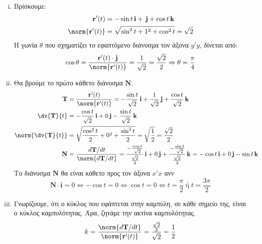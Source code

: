 \documentclass[a4paper,table]{report}
\begin{document}
\begin{solution}
  \begin{enumerate}[i)]
    \item 
      Βρίσκουμε:
      \begin{align*}
        \mathbf{r'}(t)&=- \sin{t}\, \mathbf{i} +\, \mathbf{j} + \cos{t} \, \mathbf{k} \\
        \norm{\mathbf{r'}(t)} &= \sqrt{\sin^{2}{t} + 1^{2} + \cos^{2}{t}} = \sqrt{2}
      \end{align*} 
      Η γωνία $\theta$ που σχηματίζει το εφαπτόμενο διάνυσμα τον άξονα $ y'y $, 
      δίνεται από: 
      \[
        \cos{\theta} = \frac{\mathbf{r'}(t) \cdot \mathbf{j}}{\norm{\mathbf{r'}(t)}} =
        \frac{1}{\sqrt{2}} = \frac{\sqrt{2}}{2} \Rightarrow \theta = \frac{\pi}{4}
      \]
    \item Θα βρούμε το πρώτο κάθετο διάνυσμα $ \mathbf{N} $.
      \begin{align*}
        \mathbf{T} &= \frac{\mathbf{r'}(t)}{\norm{\mathbf{r'}(t)}} =  -
        \frac{\sin{t}}{\sqrt{2}}\,\mathbf{i} +
        \frac{1}{\sqrt{2}}\,\mathbf{j} + \frac{\cos{t}}{\sqrt{2}}\,\mathbf{k} \\
        \dv{\mathbf{T}}{t} &=  - \frac{\cos{t}}{\sqrt{2}}\,\mathbf{i} + 0
        \,\mathbf{j} - \frac{\sin{t}}{\sqrt{2}}\,\mathbf{k} \\
        \norm{\dv{\mathbf{T}}{t}} &= \sqrt{\frac{\cos^{2}{t}}{2} + 0^{2} +
        \frac{\sin^{2}{t}}{2}} = \sqrt{\frac{1}{2}} = \frac{\sqrt{2}}{2} \\
          \mathbf{N} &= \frac{{d\mathbf{T}}/{dt}}{\norm{{d\mathbf{T}}/{dt}}} =
          \frac{- \frac{\cos{t}}{\sqrt{2}}}{\frac{\sqrt{2}}{2}} \, \mathbf{i} + 0 \,
          \mathbf{j} + \frac{- \frac{\sin{t}}{\sqrt{2}}}{\frac{\sqrt{2}}{2}} \, \mathbf{k}
          = - \cos{t} \, \mathbf{i} + 0 \, \mathbf{j} - \sin{t} \, \mathbf{k} 
        \end{align*}
        Το διάνυσμα $ \mathbf{N} $ θα είναι κάθετο προς τον άξονα $ x'x $ ανν 
        \[
          \mathbf{N}\cdot \mathbf{i} = 0 \Leftrightarrow - \cos{t} = 0 \Leftrightarrow
          \cos{t} = 0 \Leftrightarrow t= \frac{\pi}{2} \; \text{ή} \; t= 
          \frac{3\pi}{2} 
        \]
      \item Γνωρίζουμε, ότι ο κύκλος που εφάπτεται στην καμπύλη, σε κάθε σημείο της,
        είναι ο κύκλος καμπυλότητας. Άρα, ζητάμε την ακτίνα καμπυλότητας.
        \[
          k = \frac{\norm{d \mathbf{T}/dt}}{\norm{\mathbf{r'}(t)}} =
          \frac{\frac{\sqrt{2}}{2}}{\sqrt{2}} = \frac{1}{2}
\]
\end{enumerate}
\end{solution}
\end{document}
